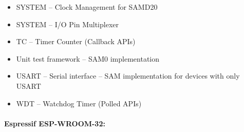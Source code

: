 \begin{multicols}{2}
\begin{flushleft}
\begin{itemize}
            \item SYSTEM -- Clock Management for SAMD20
            \item SYSTEM -- I/O Pin Multiplexer
            \item TC -- Timer Counter (Callback \ac{API}s)
            \item Unit test framework -- SAM0 implementation
            \item USART -- Serial interface -- SAM implementation for devices with only USART
            \item WDT -- Watchdog Timer (Polled \ac{API}s)
        \end{itemize}
    \end{flushleft}
\end{multicols}

\paragraph{Espressif ESP-WROOM-32:} \cite{ESP32API}
